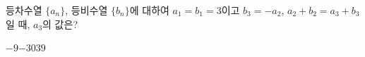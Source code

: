 등차수열 $\{a_n\}$, 등비수열 $\{b_n\}$에 대하여 $a_1=b_1=3$이고 $b_3=-a_2$, $a_2+b_2=a_3+b_3$일 때, $a_3$의 값은?
\begin{choices32}{$-9$}{$-3$}{$0$}{$3$}{$9$}\end{choices32}
